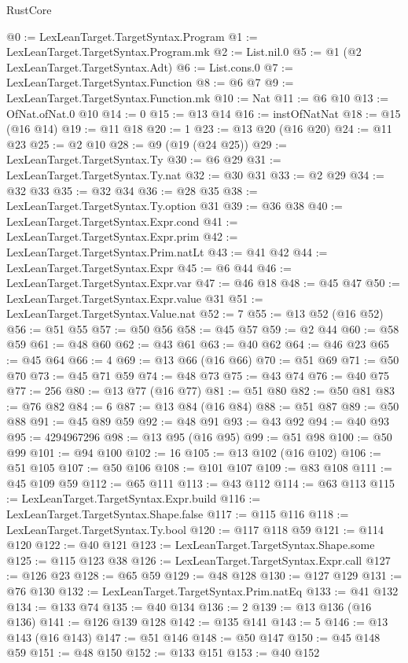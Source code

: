 \begin{lexlean}{RustCore}
\begin{coremodule}
@0 := LexLeanTarget.TargetSyntax.Program
@1 := LexLeanTarget.TargetSyntax.Program.mk
@2 := List.nil.{0}
@5 := @1 (@2 LexLeanTarget.TargetSyntax.Adt)
@6 := List.cons.{0}
@7 := LexLeanTarget.TargetSyntax.Function
@8 := @6 @7
@9 := LexLeanTarget.TargetSyntax.Function.mk
@10 := Nat
@11 := @6 @10
@13 := OfNat.ofNat.{0} @10
@14 := 0
@15 := @13 @14
@16 := instOfNatNat
@18 := @15 (@16 @14)
@19 := @11 @18
@20 := 1
@23 := @13 @20 (@16 @20)
@24 := @11 @23
@25 := @2 @10
@28 := @9 (@19 (@24 @25))
@29 := LexLeanTarget.TargetSyntax.Ty
@30 := @6 @29
@31 := LexLeanTarget.TargetSyntax.Ty.nat
@32 := @30 @31
@33 := @2 @29
@34 := @32 @33
@35 := @32 @34
@36 := @28 @35
@38 := LexLeanTarget.TargetSyntax.Ty.option @31
@39 := @36 @38
@40 := LexLeanTarget.TargetSyntax.Expr.cond
@41 := LexLeanTarget.TargetSyntax.Expr.prim
@42 := LexLeanTarget.TargetSyntax.Prim.natLt
@43 := @41 @42
@44 := LexLeanTarget.TargetSyntax.Expr
@45 := @6 @44
@46 := LexLeanTarget.TargetSyntax.Expr.var
@47 := @46 @18
@48 := @45 @47
@50 := LexLeanTarget.TargetSyntax.Expr.value @31
@51 := LexLeanTarget.TargetSyntax.Value.nat
@52 := 7
@55 := @13 @52 (@16 @52)
@56 := @51 @55
@57 := @50 @56
@58 := @45 @57
@59 := @2 @44
@60 := @58 @59
@61 := @48 @60
@62 := @43 @61
@63 := @40 @62
@64 := @46 @23
@65 := @45 @64
@66 := 4
@69 := @13 @66 (@16 @66)
@70 := @51 @69
@71 := @50 @70
@73 := @45 @71 @59
@74 := @48 @73
@75 := @43 @74
@76 := @40 @75
@77 := 256
@80 := @13 @77 (@16 @77)
@81 := @51 @80
@82 := @50 @81
@83 := @76 @82
@84 := 6
@87 := @13 @84 (@16 @84)
@88 := @51 @87
@89 := @50 @88
@91 := @45 @89 @59
@92 := @48 @91
@93 := @43 @92
@94 := @40 @93
@95 := 4294967296
@98 := @13 @95 (@16 @95)
@99 := @51 @98
@100 := @50 @99
@101 := @94 @100
@102 := 16
@105 := @13 @102 (@16 @102)
@106 := @51 @105
@107 := @50 @106
@108 := @101 @107
@109 := @83 @108
@111 := @45 @109 @59
@112 := @65 @111
@113 := @43 @112
@114 := @63 @113
@115 := LexLeanTarget.TargetSyntax.Expr.build
@116 := LexLeanTarget.TargetSyntax.Shape.false
@117 := @115 @116
@118 := LexLeanTarget.TargetSyntax.Ty.bool
@120 := @117 @118 @59
@121 := @114 @120
@122 := @40 @121
@123 := LexLeanTarget.TargetSyntax.Shape.some
@125 := @115 @123 @38
@126 := LexLeanTarget.TargetSyntax.Expr.call
@127 := @126 @23
@128 := @65 @59
@129 := @48 @128
@130 := @127 @129
@131 := @76 @130
@132 := LexLeanTarget.TargetSyntax.Prim.natEq
@133 := @41 @132
@134 := @133 @74
@135 := @40 @134
@136 := 2
@139 := @13 @136 (@16 @136)
@141 := @126 @139 @128
@142 := @135 @141
@143 := 5
@146 := @13 @143 (@16 @143)
@147 := @51 @146
@148 := @50 @147
@150 := @45 @148 @59
@151 := @48 @150
@152 := @133 @151
@153 := @40 @152

\end{coremodule}
\end{lexlean}
